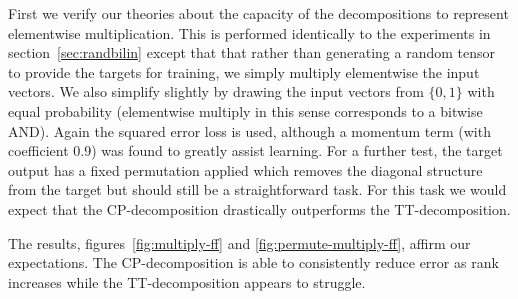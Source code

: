 {First we verify our theories about the capacity of the decompositions to represent elementwise
multiplication. This is performed identically to the experiments in section~\ref{sec:randbilin}
except that that rather than generating a random tensor to provide the targets for training,
we simply multiply elementwise the input vectors. We also simplify slightly by drawing the
input vectors from \(\{0,1\}\) with equal probability
(elementwise multiply in this sense corresponds to a bitwise AND). 
Again the squared error loss is used, although
a momentum term (with coefficient 0.9) was found to greatly assist learning.
For a further test, the target
output has a fixed permutation applied which removes the diagonal structure from the target but
should still be a straightforward task. For this task we would
expect that the CP-decomposition drastically outperforms the TT-decomposition.

The results, figures~\ref{fig:multiply-ff} and \ref{fig:permute-multiply-ff}, affirm our
expectations. The CP-decomposition is able to consistently reduce error as rank increases
 while the TT-decomposition appears to struggle.


}
